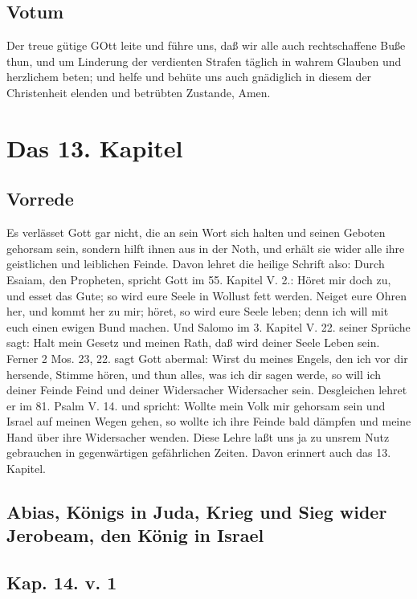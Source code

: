 \section{Votum}

Der treue gütige GOtt leite und führe uns, daß wir alle auch rechtschaffene Buße thun, und um Linderung der verdienten Strafen täglich in wahrem Glauben und herzlichem beten; und helfe und behüte uns auch gnädiglich in diesem der Christenheit elenden und betrübten Zustande, Amen.

\chapter{Das 13. Kapitel}

\section{Vorrede}

Es verlässet Gott gar nicht, die an sein Wort sich halten und seinen Geboten gehorsam sein, sondern hilft ihnen aus in der Noth, und erhält sie wider alle ihre geistlichen und leiblichen Feinde. Davon lehret die heilige Schrift also: Durch Esaiam, den Propheten, spricht Gott im 55. Kapitel V. 2.: Höret mir doch zu, und esset das Gute; so wird eure Seele in Wollust fett werden. Neiget eure Ohren her, und kommt her zu mir; höret, so wird eure Seele leben; denn ich will mit euch einen ewigen Bund machen. Und Salomo im 3. Kapitel V. 22. seiner Sprüche sagt: Halt mein Gesetz und meinen Rath, daß wird deiner Seele Leben sein. Ferner 2 Mos. 23, 22. sagt Gott abermal: Wirst du meines Engels, den ich vor dir hersende, Stimme hören, und thun alles, was ich dir sagen werde, so will ich deiner Feinde Feind und deiner Widersacher Widersacher sein. Desgleichen lehret er im 81. Psalm V. 14. und spricht: Wollte mein Volk mir gehorsam sein und Israel auf meinen Wegen gehen, so wollte ich ihre Feinde bald dämpfen und meine Hand über ihre Widersacher wenden. Diese Lehre laßt uns ja zu unsrem Nutz gebrauchen in gegenwärtigen gefährlichen Zeiten. Davon erinnert auch das 13. Kapitel.

\section[Abias, Königs in Juda, Krieg und Sieg wider]{Abias, Königs in Juda, Krieg und Sieg wider Jerobeam, den König in Israel}

\section[Kap. 14. v. 1]{Kap. 14. v. 1}

